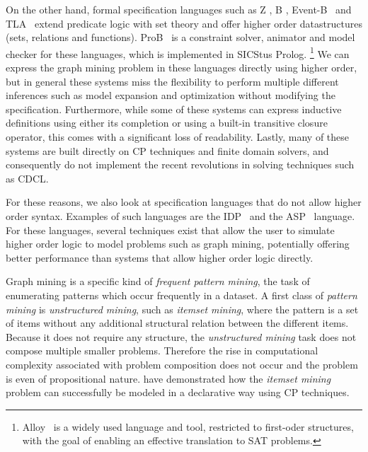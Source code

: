 On the other hand, formal specification languages such as Z \citep{Bowen:Z}, B \citep{Abrial:BBook}, Event-B~\citep{Abrial10} and TLA~\citep{books/aw/Lamport2002}
 extend predicate logic with set theory and offer
 higher order datastructures (sets, relations and functions).
ProB~\citep{journals/sttt/LeuschelB08} is a constraint solver, animator and model checker for these languages,
 which is implemented in SICStus Prolog.%
\footnote{
Alloy~\citep{tosem/Jackson02} is a widely used language and tool,
  restricted to first-oder structures, with the goal of enabling an effective translation to SAT problems.}
We can express the graph mining problem in these languages directly using higher order, 
but in general these systems miss the flexibility to perform multiple different inferences such as model expansion and optimization without modifying the specification.
Furthermore, while some of these systems can express inductive definitions using either its completion or using a built-in transitive closure operator, this comes with a significant loss of readability.
Lastly, many of these systems are built directly on CP techniques and finite domain solvers, and consequently do not implement the recent revolutions in solving techniques such as CDCL.

For these reasons, we also look at specification languages that do not allow higher order syntax.
Examples of such languages are the IDP~\citep{WarrenBook/DeCatBBD16} and the ASP~\citep{conf/rweb/EiterIK09} language.
For these languages, several techniques exist that allow the user to simulate higher order logic to model problems such as graph mining, potentially offering better performance than systems that allow higher order logic directly.


Graph mining is a specific kind of \emph{frequent pattern mining}, 
the task of enumerating patterns which occur frequently in a dataset.
A first class of \emph{pattern mining} is \emph{unstructured mining}, such as \emph{itemset mining}, where the pattern is a set of items without any additional structural relation between the different items. 
Because it does not require any structure, the \emph{unstructured mining} task does not compose multiple smaller problems.
Therefore the rise in computational complexity associated with problem composition does not occur and the problem is even of propositional nature.
\citet{tias_original} have demonstrated how the \emph{itemset mining} problem can successfully be modeled in a declarative way using CP techniques.

